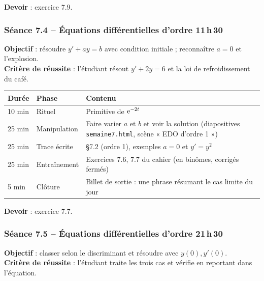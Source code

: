 \documentclass[10.5pt,a4paper]{article}
\newif\ifprof
\newcommand{\profonly}[1]{\ifprof #1\fi}
\begin{document}
\textbf{Devoir} : exercice 7.9.\profonly{ \textbf{Point de vigilance} : Oublier le facteur $r$ dans l'élément d'aire.}\par
{}\subsubsection*{\textcolor{marine}{Séance 7.4 -- Équations différentielles d'ordre 1}\hfill\normalfont\small\textcolor{ardoise}{1\,h\,30}}
\begin{objectif}\textbf{Objectif} : résoudre $y'+ay=b$ avec condition initiale ; reconnaître $a=0$ et l'explosion.\\\textbf{Critère de réussite} : l'étudiant résout $y'+2y=6$ et la loi de refroidissement du café.\end{objectif}\nopagebreak
\begin{longtable}{@{}p{1.1cm}p{2.4cm}p{12.4cm}@{}}
\toprule \textbf{Durée} & \textbf{Phase} & \textbf{Contenu}\\ \midrule\endhead
10 min & Rituel & Primitive de $\mathrm{e}^{-2t}$\\
25 min & Manipulation & Faire varier $a$ et $b$ et voir la solution (diapositives \texttt{semaine7.html}, scène « EDO d'ordre 1 »)\\
25 min & Trace écrite & \S7.2 (ordre 1), exemples $a=0$ et $y'=y^2$\\
25 min & Entraînement & Exercices 7.6, 7.7 du cahier (en binômes, corrigés fermés)\\
5 min & Clôture & Billet de sortie : une phrase résumant le cas limite du jour\\ \bottomrule\end{longtable}\nopagebreak
\textbf{Devoir} : exercice 7.7.\profonly{ \textbf{Point de vigilance} : $a=0$ : la formule $b/a$ n'existe pas.}\par
{}\subsubsection*{\textcolor{marine}{Séance 7.5 -- Équations différentielles d'ordre 2}\hfill\normalfont\small\textcolor{ardoise}{1\,h\,30}}
\begin{objectif}\textbf{Objectif} : classer selon le discriminant et résoudre avec $y(0),y'(0)$.\\\textbf{Critère de réussite} : l'étudiant traite les trois cas et vérifie en reportant dans l'équation.\end{objectif}\nopagebreak
\end{document}
